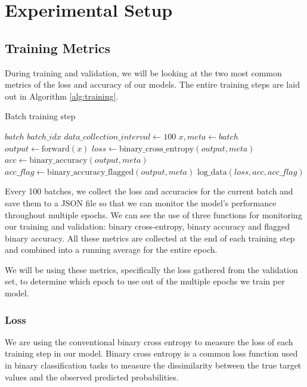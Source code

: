 \chapter{Experimental Setup}

\section{Training Metrics}

During training and validation, we will be looking at the two most common metrics of the loss and accuracy of our models. The entire training steps are laid out in Algorithm \ref{alg:training}.

\begin{algorithm}[H]
    \caption{Batch training step}
    \begin{algorithmic}[1]
        \Require $batch$
        \Require $batch\_idx$
        \State $data\_collection\_interval \gets 100$
        \State $x, meta \gets batch$
        \State $output \gets \text{forward}(x)$
        \State $loss \gets \text{binary\_cross\_entropy}(output, meta)$
        \State $acc \gets \text{binary\_accuracy}(output, meta)$
        \State $acc\_flag \gets \text{binary\_accuracy\_flagged}(output, meta)$
        \State $\text{log\_data}(loss, acc, acc\_flag)$
        \EndIf
    \end{algorithmic}
    \label{alg:training}
\end{algorithm}

Every 100 batches, we collect the loss and accuracies for the current batch and save them to a JSON file so that we can monitor the model's performance throughout multiple epochs. We can see the use of three functions for monitoring our training and validation: binary cross-entropy, binary accuracy and flagged binary accuracy. All these metrics are collected at the end of each training step and combined into a running average for the entire epoch.

We will be using these metrics, specifically the loss gathered from the validation set, to determine which epoch to use out of the multiple epochs we train per model.

\subsection{Loss}

We are using the conventional binary cross entropy to measure the loss of each training step in our model. Binary cross entropy is a common loss function used in binary classification tasks to measure the dissimilarity between the true target values and the observed predicted probabilities.

